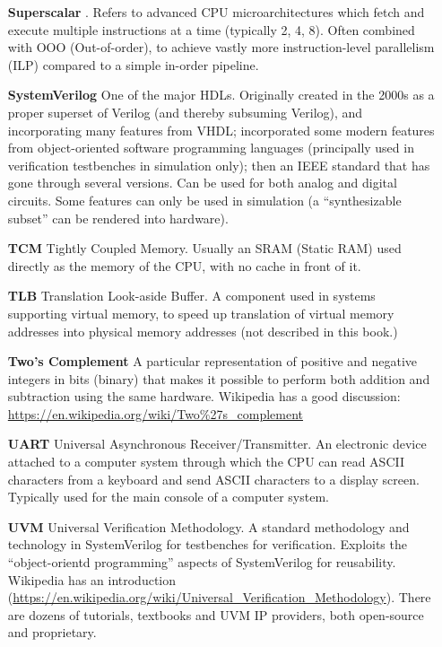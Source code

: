 \begin{itemize}
\item[\bf Superscalar].  Refers to advanced CPU microarchitectures
  which fetch and execute multiple instructions at a time (typically
  2, 4, 8).  Often combined with OOO (Out-of-order), to achieve vastly
  more instruction-level parallelism (ILP) compared to a simple
  in-order pipeline.

\item[\bf SystemVerilog] One of the major HDLs.  Originally created in
  the 2000s as a proper superset of Verilog (and thereby subsuming
  Verilog), and incorporating many features from VHDL; incorporated
  some modern features from object-oriented software programming
  languages (principally used in verification testbenches in
  simulation only); then an IEEE standard that has gone through
  several versions.  Can be used for both analog and digital circuits.
  Some features can only be used in simulation (a ``synthesizable
  subset'' can be rendered into hardware).

\item[\bf TCM] Tightly Coupled Memory. Usually an SRAM (Static RAM)
  used directly as the memory of the CPU, with no cache in front of
  it.

\item[\bf TLB] Translation Look-aside Buffer.  A component used in
  systems supporting virtual memory, to speed up translation of
  virtual memory addresses into physical memory addresses (not
  described in this book.)

\item[\bf Two's Complement] A particular representation of positive
  and negative integers in bits (binary) that makes it possible to
  perform both addition and subtraction using the same
  hardware. Wikipedia has a good discussion:
  \url{https://en.wikipedia.org/wiki/Two%27s_complement}

\item[\bf UART] Universal Asynchronous Receiver/Transmitter.  An
  electronic device attached to a computer system through which the
  CPU can read ASCII characters from a keyboard and send ASCII
  characters to a display screen.  Typically used for the main console
  of a computer system.

\item[\bf UVM] Universal Verification Methodology.  A standard
  methodology and technology in SystemVerilog for testbenches for
  verification. Exploits the ``object-orientd programming'' aspects of
  SystemVerilog for reusability. Wikipedia has an introduction
  (\url{https://en.wikipedia.org/wiki/Universal_Verification_Methodology}).
  There are dozens of tutorials, textbooks and UVM IP providers, both
  open-source and proprietary.


\end{itemize}
